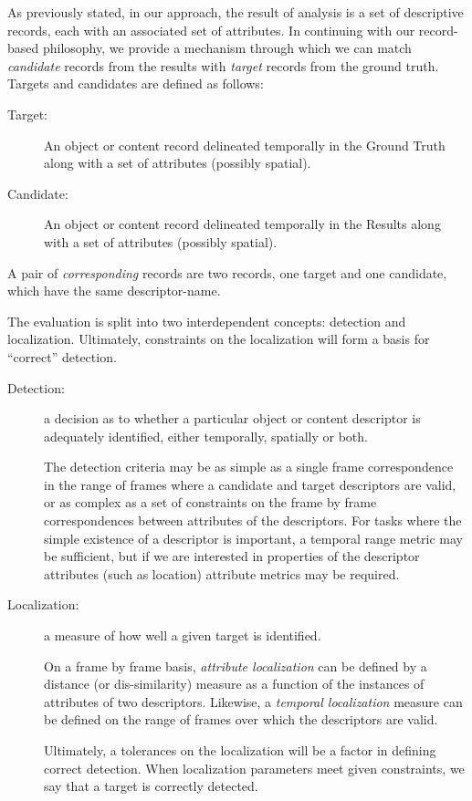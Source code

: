 As previously stated, in our approach, the result of analysis is a set
of descriptive records, each with an associated set of attributes.  In
continuing with our record-based philosophy, we provide a mechanism
through which we can match {\em candidate} records from the results
with {\em target} records from the ground truth. Targets and
candidates are defined as follows:

\begin{description} 

\item [Target:] An object or content record delineated temporally in
the Ground Truth along with a set of attributes (possibly spatial).

\item [Candidate:] An object or content record delineated temporally
in the Results along with a set of attributes (possibly spatial).
\end{description}

A pair of {\em corresponding} records are two records, one target and
one candidate, which have the same descriptor-name.

The evaluation is split into two interdependent concepts: detection
and localization.  Ultimately, constraints on the localization will
form a basis for ``correct'' detection.

\begin{description} 

\item [Detection:] a decision as to whether a particular object or
content descriptor is adequately identified, either temporally,
spatially or both.

The detection criteria may be as simple as a single frame
correspondence in the range of frames where a candidate and target
descriptors are valid, or as complex as a set of constraints on the
frame by frame correspondences between attributes of the descriptors.
For tasks where the simple existence of a descriptor is important, a
temporal range metric may be sufficient, but if we are interested in
properties of the descriptor attributes (such as location) attribute
metrics may be required.

\item [Localization:] a measure of how well a given target is identified.  

On a frame by frame basis, {\em attribute localization} can be defined by a
distance (or dis-similarity) measure as a function of the instances of
attributes of two descriptors.  Likewise, a {\em temporal localization}
measure can be defined on the range of frames over which the
descriptors are valid.

Ultimately, a tolerances on the localization will be a factor in
defining correct detection.  When localization parameters meet given
constraints, we say that a target is correctly detected.

\end{description}

